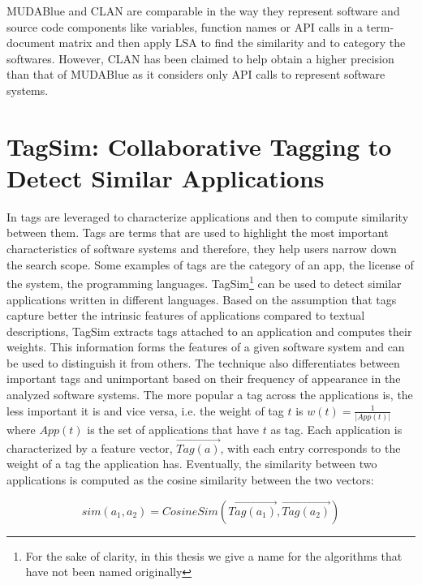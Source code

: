 MUDABlue and CLAN are comparable in the way they represent software and source code components like variables, function names or API calls in a term-document matrix and then apply LSA to find the similarity and to category the softwares. However, CLAN has been claimed to help obtain a higher precision than that of MUDABlue as it considers only API calls to represent software systems. 


\section{TagSim: Collaborative Tagging to Detect Similar Applications}\label{sec:tagsim}

In \cite{Lo:2012:DSA:2473496.2473616} tags are leveraged to characterize applications and then to compute similarity between them. Tags are terms that are used to highlight the most important characteristics of software systems \cite{xia:tag:2013} and therefore, they help users narrow down the search scope. Some examples of tags are the category of an app, the license of the system, the programming languages. TagSim\footnote{For the sake of clarity, in this thesis we give a name for the algorithms that have not been named originally} can be used to detect similar applications written in different languages. Based on the assumption that tags capture better the intrinsic features of applications compared to textual descriptions, TagSim extracts tags attached to an application and computes their weights. This information forms the features of a given software system and can be used to distinguish it from others. The technique also differentiates between important tags and unimportant based on their frequency of appearance in the analyzed software systems. The more popular a tag across the applications is, the less important it is and vice versa, i.e. the weight of tag $t$ is $w(t) = \frac{1}{|App(t)|}$ where $App(t)$ is the set of applications that have $t$ as tag. Each application is characterized by a feature vector, $\vec{Tag(a)}$, with each entry corresponds to the weight of a tag the application has. Eventually, the similarity between two applications is computed as the cosine similarity between the two vectors:

\begin{equation}
sim(a_{1},a_{2})= CosineSim(\vec{Tag(a_{1})},\vec{Tag(a_{2})})
\end{equation}

